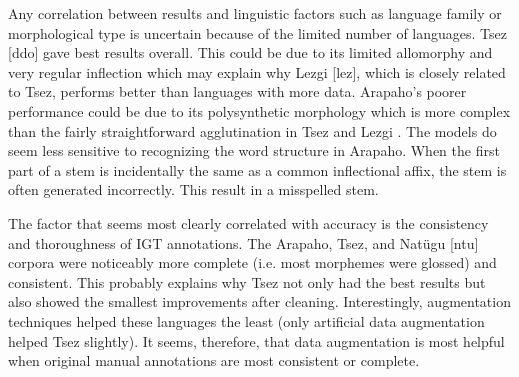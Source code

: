 Any correlation between results and linguistic factors such as language family or morphological type is uncertain because of the limited number of languages. Tsez [ddo] gave best results overall. This could be due to its limited allomorphy and very regular inflection which may explain why Lezgi [lez], which is closely related to Tsez, performs better than languages with more data. Arapaho's poorer performance could be due to its polysynthetic morphology \citep{cowell_arapaho_2008} which is more complex than the fairly straightforward agglutination in Tsez \citep{job_tsez_1994} and Lezgi \citep{haspelmath_grammar_1993}. The models do seem less sensitive to recognizing the word structure in Arapaho. When the first part of a stem is incidentally the same as a common inflectional affix, the stem is often generated incorrectly. This result in a misspelled stem. 


The factor that seems most clearly correlated with accuracy is the consistency and thoroughness of IGT annotations. The Arapaho, Tsez, and  Nat\"ugu [ntu] corpora were noticeably more complete (i.e. most morphemes were glossed) and consistent. This probably explains why Tsez not only had the best results but also showed the smallest improvements after cleaning. Interestingly, augmentation techniques helped these languages the least (only artificial data augmentation helped Tsez slightly). It seems, therefore, that data augmentation is most helpful when original manual annotations are most consistent or complete. 

